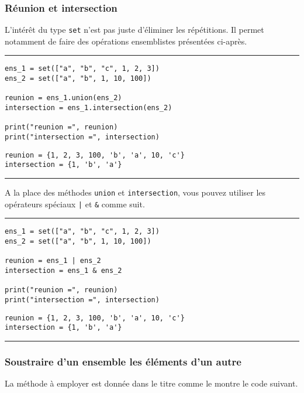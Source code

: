 \subsubsection{Réunion et intersection}

L'intérêt du type \texttt{set} n'est pas juste d'éliminer les répétitions. Il permet notamment de faire des opérations ensemblistes présentées ci-après.


\bigskip
{\hrule height .5mm}
\begin{verbatim}
ens_1 = set(["a", "b", "c", 1, 2, 3])
ens_2 = set(["a", "b", 1, 10, 100])

reunion = ens_1.union(ens_2)
intersection = ens_1.intersection(ens_2)

print("reunion =", reunion)
print("intersection =", intersection)
\end{verbatim}
 \color{ForestGreen}
\vspace{-1.5em}
\begin{verbatim}
reunion = {1, 2, 3, 100, 'b', 'a', 10, 'c'}
intersection = {1, 'b', 'a'}
\end{verbatim} \color{Black}
{\hrule height .5mm}
\bigskip


A la place des méthodes \texttt{union} et \texttt{intersection}, vous pouvez utiliser les opérateurs spéciaux \texttt{|} et \texttt{\&} comme suit.


\bigskip
{\hrule height .5mm}
\begin{verbatim}
ens_1 = set(["a", "b", "c", 1, 2, 3])
ens_2 = set(["a", "b", 1, 10, 100])

reunion = ens_1 | ens_2
intersection = ens_1 & ens_2

print("reunion =", reunion)
print("intersection =", intersection)
\end{verbatim}
 \color{ForestGreen}
\vspace{-1.5em}
\begin{verbatim}
reunion = {1, 2, 3, 100, 'b', 'a', 10, 'c'}
intersection = {1, 'b', 'a'}
\end{verbatim} \color{Black}
{\hrule height .5mm}
\bigskip


\subsubsection{Soustraire d'un ensemble les éléments d'un autre}

La méthode à employer est donnée dans le titre comme le montre le code suivant.


